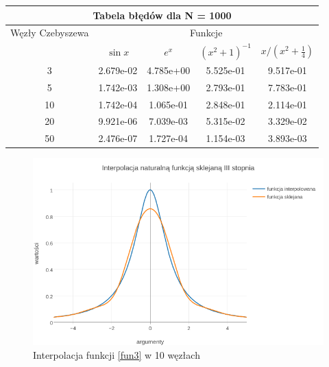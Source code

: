 \documentclass{article}
\begin{document}
\renewcommand{\arraystretch}{1.5}  
\begin{center}
	\begin{tabular}{||c||c|c|c|c||} \hline
		\multicolumn{5}{||c||}{Tabela błędów dla N = 1000} \\ \hline
		Węzły Czebyszewa 	& \multicolumn{4}{|c||}{Funkcje} \\ \cline{2-5}
		& $\sin x$ & $e^x$ & $(x^{2}+1)^{-1}$ & $x/(x^{2} + \frac{1}{4})$ \\ \hline					
		3 		& 2.679e-02 &  4.785e+00 &  5.525e-01 & 9.517e-01 \\ \hline
		5 		& 1.742e-03 &  1.308e+00 &  2.793e-01 & 7.783e-01 \\ \hline
		10  	& 1.742e-04 &  1.065e-01 &  2.848e-01 & 2.114e-01 \\ \hline
		20  	& 9.921e-06 &  7.039e-03 &  5.315e-02 & 3.329e-02 \\ \hline
		50  	& 2.476e-07 &  1.727e-04 &  1.154e-03 & 3.893e-03 \\ \hline
	\end{tabular}
\end{center}
\renewcommand{\arraystretch}{1}

\begin{figure}[ht]
	\begin{center}
		\includegraphics[width=13cm]{spline_c}
	\end{center}
	\caption{Interpolacja funkcji \eqref{fun3} w 10 węzłach}
	\label{fig:rysunek3}
\end{figure}
\end{document}
